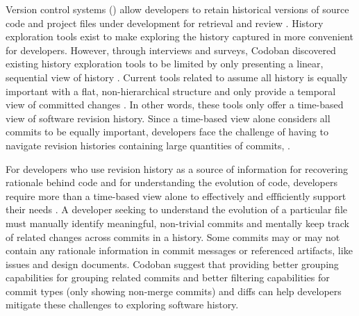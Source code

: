Version control systems () allow developers to retain historical versions of source
code and project files under development for retrieval and review \cite{ruparelia_history-vcs_2010}.
History exploration tools exist to make exploring the history captured in  more
convenient for developers.
However, through interviews and surveys, Codoban \etal discovered existing history exploration tools 
to be limited by only presenting a linear, sequential view of history \cite{codoban_software_2015}.
Current tools related to  assume all history is equally important 
with a flat, non-hierarchical structure and only provide a temporal view of committed changes \cite{codoban_software_2015}.
In other words, these tools only offer a time-based view of software revision history.
Since a time-based view alone considers all commits to be equally important,
developers face the challenge of having to navigate revision histories containing 
large quantities of commits, .

For developers who use revision history as a source of information
for recovering rationale behind code and for understanding the evolution of code, 
developers require more than a time-based view alone to effectively 
and effficiently support their needs \cite{codoban_software_2015}.
A developer seeking to understand the evolution of a particular file must 
manually identify meaningful, non-trivial commits and mentally keep track of related
changes across commits in a history.
Some commits may or may not contain any rationale information in
commit messages or referenced artifacts, like issues and design documents.
Codoban \etal suggest that providing better grouping capabilities for
grouping related commits and better filtering capabilities for commit types (\eg only showing non-merge commits) and diffs
can help developers mitigate these challenges to exploring software history.

